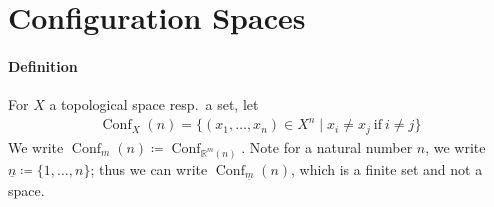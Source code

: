 \documentclass{scrartcl}
\theoremstyle{plain}
\theoremstyle{definition}
\newcommand{\R}{\mathbb R}
\newcommand{\defeq}{\coloneqq}
\DeclareMathOperator{\Conf}{Conf}
\begin{document}




\section{Configuration Spaces}

\paragraph{Definition} For $X$ a topological space resp.\ a set, let
\begin{align*}
    \Conf_X(n) = \{(x_1,\dots, x_n)\in X^n \mid x_i \neq x_j\ \text{if}\ i\neq j\}
\end{align*}
We write $\Conf_m(n) \coloneqq \Conf_{\R^m(n)}$. Note for a natural number $n$, we write $\underline n \defeq \{1, \dots, n\}$; thus we can write $\Conf_{\underline m}(n)$, which is a finite set and not a space. 
\end{document}
